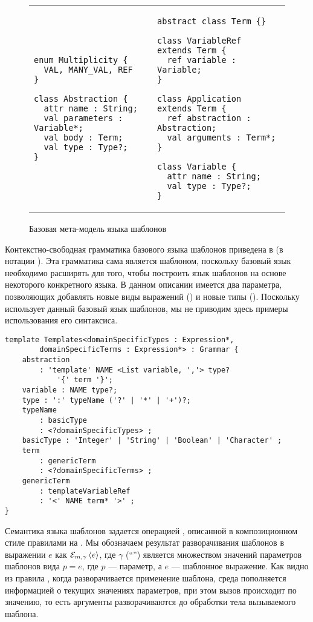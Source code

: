 {{\begin{figure}[htbp]
\begin{tabular}{p{}p{}}
\begin{lstlisting}[xleftmargin=0cm]
enum Multiplicity {
  VAL, MANY_VAL, REF
}

class Abstraction {
  attr name : String;
  val parameters : Variable*;
  val body : Term;
  val type : Type?;
}

\end{lstlisting}
&
\begin{lstlisting}[xleftmargin=0cm]
abstract class Term {}

class VariableRef extends Term {
  ref variable : Variable;
}

class Application extends Term {
  ref abstraction : Abstraction;
  val arguments : Term*;
}

class Variable {
  attr name : String;
  val type : Type?;
}
\end{lstlisting}
\end{tabular}
	\caption{Базовая мета-модель языка шаблонов}\label{TempMM}
\end{figure}

Контекстно-свободная грамматика базового языка шаблонов приведена в  (в нотации \GRM{}). Эта грамматика сама является шаблоном, поскольку базовый язык необходимо расширять для того, чтобы построить язык шаблонов на основе некоторого конкретного языка. В данном описании имеется два параметра, позволяющих добавлять новые виды выражений () и новые типы (). Поскольку \GRM{} использует данный базовый язык шаблонов, мы не приводим здесь примеры использования его синтаксиса.

\begin{lstlisting}[label=TempG,float=htbp,caption=Базовый синтаксис языка шаблонов]
template Templates<domainSpecificTypes : Expression*, 
		domainSpecificTerms : Expression*> : Grammar {
	abstraction 
		: 'template' NAME <List variable, ','> type? 
			'{' term '}';
	variable : NAME type?;
	type : ':' typeName ('?' | '*' | '+')?;
	typeName
		: basicType
		: <?domainSpecificTypes> ;
	basicType : 'Integer' | 'String' | 'Boolean' | 'Character' ;
	term
		: genericTerm
		: <?domainSpecificTerms> ;
	genericTerm
		: templateVariableRef
		: '<' NAME term* '>' ;
}
\end{lstlisting}

Семантика языка шаблонов задается операцией , описанной в композиционном стиле правилами на . Мы обозначаем результат разворачивания шаблонов в выражении $e$ как $\mathcal{E}_{m, \gamma} \left\langle e \right\rangle$, где $\gamma$ (``'') является множеством значений параметров шаблонов вида $p = e$, где $p$ --- параметр, а $e$ --- шаблонное выражение. Как видно из правила , когда разворачивается применение шаблона, среда пополняется информацией о текущих значениях параметров, при этом вызов происходит по значению, то есть аргументы разворачиваются до обработки тела вызываемого шаблона. 

}}
